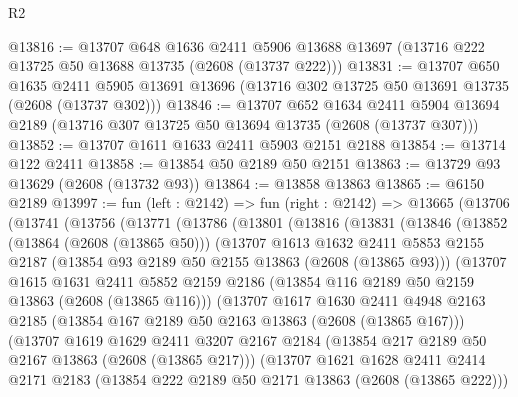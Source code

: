 \begin{lexlean}{R2}
\begin{coremodule}
@13816 := @13707
    @648
    @1636
    @2411
    @5906
    @13688
    @13697
    (@13716 @222 @13725 @50 @13688 @13735 (@2608 (@13737 @222)))
@13831 := @13707
    @650
    @1635
    @2411
    @5905
    @13691
    @13696
    (@13716 @302 @13725 @50 @13691 @13735 (@2608 (@13737 @302)))
@13846 := @13707
    @652
    @1634
    @2411
    @5904
    @13694
    @2189
    (@13716 @307 @13725 @50 @13694 @13735 (@2608 (@13737 @307)))
@13852 := @13707 @1611 @1633 @2411 @5903 @2151 @2188
@13854 := @13714 @122 @2411
@13858 := @13854 @50 @2189 @50 @2151
@13863 := @13729 @93 @13629 (@2608 (@13732 @93))
@13864 := @13858 @13863
@13865 := @6150 @2189
@13997 := fun (left : @2142) =>
  fun (right : @2142) =>
  @13665
    (@13706
      (@13741
        (@13756
          (@13771
            (@13786
              (@13801
                (@13816
                  (@13831
                    (@13846
                      (@13852
                        (@13864 (@2608 (@13865 @50)))
                        (@13707
                          @1613
                          @1632
                          @2411
                          @5853
                          @2155
                          @2187
                          (@13854 @93 @2189 @50 @2155 @13863 (@2608 (@13865 @93)))
                          (@13707
                            @1615
                            @1631
                            @2411
                            @5852
                            @2159
                            @2186
                            (@13854 @116 @2189 @50 @2159 @13863 (@2608 (@13865 @116)))
                            (@13707
                              @1617
                              @1630
                              @2411
                              @4948
                              @2163
                              @2185
                              (@13854 @167 @2189 @50 @2163 @13863 (@2608 (@13865 @167)))
                              (@13707
                                @1619
                                @1629
                                @2411
                                @3207
                                @2167
                                @2184
                                (@13854 @217 @2189 @50 @2167 @13863 (@2608 (@13865 @217)))
                                (@13707
                                  @1621
                                  @1628
                                  @2411
                                  @2414
                                  @2171
                                  @2183
                                  (@13854 @222 @2189 @50 @2171 @13863 (@2608 (@13865 @222)))

\end{coremodule}
\end{lexlean}
